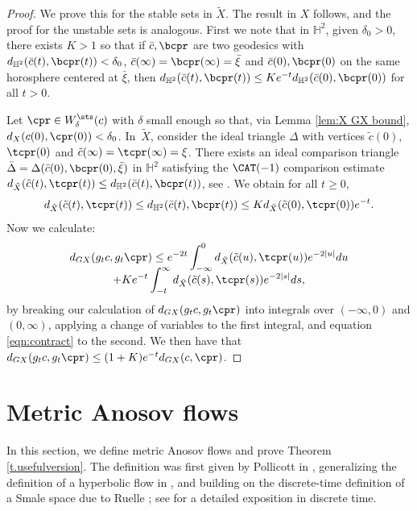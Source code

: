 \begin{proof}
We prove this for the stable sets in $\tilde X$. The result in $X$ follows, and the proof for the unstable sets is analogous. First we note that in $\mathbb{H}^2$, given $\delta_0>0$, there exists $K>1$ so that if $\bar c, \bcpr$ are two geodesics with $d_{\mathbb{H}^2}(\bar c(t), \bcpr(t) ) < \delta_0$, $\bar c(\infty)= \bcpr(\infty) = \bar \xi$ and $\bar c(0), \bcpr(0)$ on the same horosphere centered at $\bar \xi$, then $d_{\mathbb{H}^2}(\bar c(t), \bcpr(t) ) \leq K e^{-t} d_{\mathbb{H}^2}(\bar c(0), \bcpr(0)) $ for all $t>0$.

Let $\cpr \in W^{\sts}_\delta(c)$ with $\delta$ small enough so that, via Lemma \ref{lem:X GX bound}, $d_X( c(0), \cpr(0)) <\delta_0 $. In~$\tilde X$, consider the ideal triangle $\Delta$ with vertices $ \tilde c(0)$, $\tcpr(0)$ and \hbox{$\tilde c(\infty)= \tcpr(\infty)=\xi$}.
There exists an ideal comparison triangle $\bar\Delta= \Delta(\bar c(0), \bcpr(0), \bar\xi)$ in $\mathbb{H}^2$ satisfying the $\CAT(-1)$ comparison estimate $d_{\tilde X}(\tilde c(t), \tcpr(t)) \leq d_{\mathbb{H}^2}(\bar c(t), \bcpr(t))$, see \cite[Prop.\,4.4.13]{das-simmons-urbanski}. We obtain for all $t\geq 0$,
\begin{equation}\label{eqn:contract}
d_{\tilde X}(\tilde c(t), \tcpr(t)) \leq d_{\mathbb{H}^2}(\bar c(t), \bcpr(t)) \leq K d_{\tilde X}(\tilde c(0),\tcpr(0)) e^{-t}.
\end{equation}
Now we calculate:
\begin{multline*}
d_{G X}(g_t c, g_t \cpr) \leq e^{-2t} \int_{-\infty}^0 d_{\tilde X}(\tilde c(u),\tcpr(u)) e^{-2|u|}du\\[-8pt]
+ K e^{-t} \int_{-t}^\infty d_{\tilde X}(\tilde c(s),\tcpr(s)) e^{-2|s|} ds,
\end{multline*}
by breaking our calculation of $d_{G X}(g_t c, g_t \cpr)$ into integrals over $(-\infty,0)$ and $(0,\infty)$, applying a change of variables to the first integral, and equation \eqref{eqn:contract} to the second. We then have that $d_{G X}(g_t c, g_t \cpr) \leq (1+K)e^{-t} d_{G X}(c,\cpr)$.
\end{proof}

\section{Metric Anosov flows}\label{sec:Markov}

In this section, we define metric Anosov flows and prove Theorem \ref{t.usefulversion}. The definition was first given by Pollicott in \cite{pollicott}, generalizing the definition of a hyperbolic flow in \cite{bowen-periodic, bowen-symbolic}, and building on the discrete-time definition of a Smale space due to Ruelle \cite{Ruelle}; see \cite{iP2014} for a detailed exposition in discrete time.

